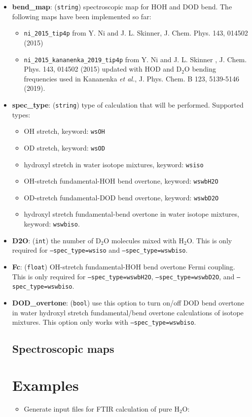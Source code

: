 \documentclass{article}
\begin{document}
\begin{itemize}
\item \textbf{bend\_map}: (\texttt{string}) spectroscopic map for HOH and DOD bend. 
The following maps have been implemented so far:
\begin{itemize}
\item \texttt{ni\_2015\_tip4p} from Y. Ni and J. L. Skinner, J. Chem. Phys. 143, 014502 (2015)
\item  \texttt{ni\_2015\_kananenka\_2019\_tip4p} from Y. Ni and J. L. Skinner , J. Chem. Phys. 143, 014502 (2015) updated with HOD and D$_2$O 
bending frequencies used in Kananenka \textit{et al.}, J. Phys. Chem. B 123, 5139-5146 (2019).
\end{itemize}


\item \textbf{spec\_type}: (\texttt{string}) type of calculation that will be performed. Supported types:
\begin{itemize}
\item OH stretch, keyword: \texttt{wsOH}
\item OD stretch, keyword: \texttt{wsOD}
\item hydroxyl stretch in water isotope mixtures, keyword: \texttt{wsiso}
\item OH-stretch fundamental-HOH bend overtone, keyword: \texttt{wswbH2O}
\item OD-stretch fundamental-DOD bend overtone, keyword: \texttt{wswbD2O}
\item hydroxyl stretch fundamental-bend overtone in water isotope mixtures, keyword: \texttt{wswbiso}.
\end{itemize}

\item \textbf{D2O}: (\texttt{int}) the number of D$_2$O molecules mixed with H$_2$O. This is only required for \texttt{--spec\_type=wsiso}
and  \texttt{--spec\_type=wswbiso}.

\item \textbf{Fc}: (\texttt{float}) OH-stretch fundamental-HOH bend overtone Fermi coupling. This is only required for \texttt{--spec\_type=wswbH2O},
\texttt{--spec\_type=wswbD2O}, and \texttt{--spec\_type=wswbiso}.

\item \textbf{DOD\_overtone}: (\texttt{bool}) use this option to turn on/off DOD bend overtone in water hydroxyl stretch fundamental/bend overtone
calculations of isotope mixtures. This option only works with \texttt{--spec\_type=wswbiso}.

\subsection{Spectroscopic maps}

\section{Examples}
\begin{itemize}

\item Generate input files for FTIR calculation of pure H$_2$O:


\end{itemize}

 

\end{itemize}
\end{document}

